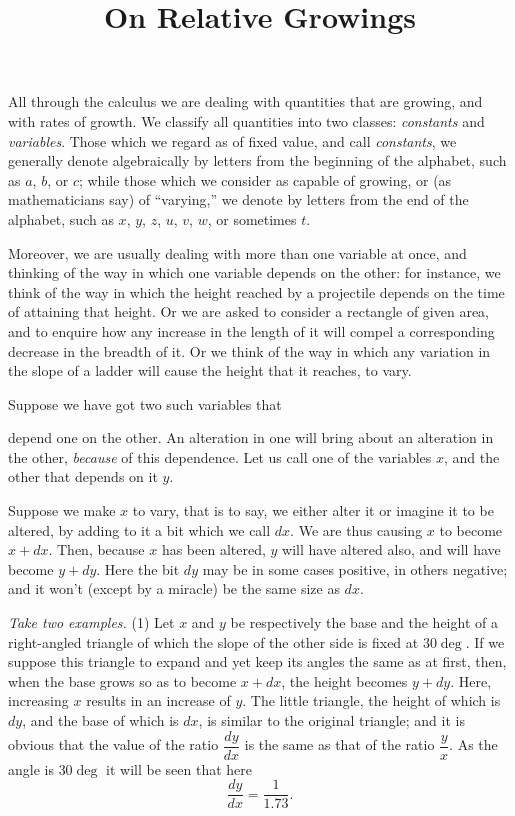 \documentclass{ximera}
\title{On Relative Growings}
\begin{document}
\begin{abstract}
\end{abstract}
\maketitle

All through the calculus we are dealing with quantities
that are growing, and with rates of growth.
We classify all quantities into two classes: \textit{constants}
and \textit{variables}. Those which we regard as of fixed
value, and call \textit{constants}, we generally denote algebraically
by letters from the beginning of the
alphabet, such as $a$, $b$, or $c$; while those which we
consider as capable of growing, or (as mathematicians
say) of “varying,” we denote by letters from the end
of the alphabet, such as $x$, $y$, $z$, $u$, $v$, $w$, or sometimes $t$.

Moreover, we are usually dealing with more than
one variable at once, and thinking of the way in
which one variable depends on the other: for instance,
we think of the way in which the height reached
by a projectile depends on the time of attaining that
height. Or we are asked to consider a rectangle of
given area, and to enquire how any increase in the
length of it will compel a corresponding decrease in
the breadth of it. Or we think of the way in which
any variation in the slope of a ladder will cause the
height that it reaches, to vary.

Suppose we have got two such variables that

depend one on the other. An alteration in one will
bring about an alteration in the other, \textit{because} of this
dependence. Let us call one of the variables $x$, and
the other that depends on it $y$.

Suppose we make $x$ to vary, that is to say, we
either alter it or imagine it to be altered, by adding
to it a bit which we call $dx$. We are thus causing $x$
to become $x + dx$. Then, because $x$ has been altered,
$y$ will have altered also, and will have become $y + dy$.
Here the bit $dy$ may be in some cases positive, in
others negative; and it won't (except by a miracle) be
the same size as $dx$.

\textit{Take two examples.}
(1) Let $x$ and $y$ be respectively the base and the
height of a right-angled triangle 
of which the slope of the other side is fixed at $30 \deg$. If we
suppose this triangle to expand and yet keep its
angles the same as at first, then, when the base grows
so as to become $x + dx$, the height becomes $y + dy$.
Here, increasing $x$ results in an increase of $y$. The
little triangle, the height of which is $dy$, and the base
of which is $dx$, is similar to the original triangle; and
it is obvious that the value of the ratio $\dfrac{dy}{dx}$ is the
same as that of the ratio $\dfrac{y}{x}$. As the angle is $30\deg$ it
will be seen that here
$$
\frac{dy}{dx} = \frac{1}{1.73}.
$$
\end{document}
